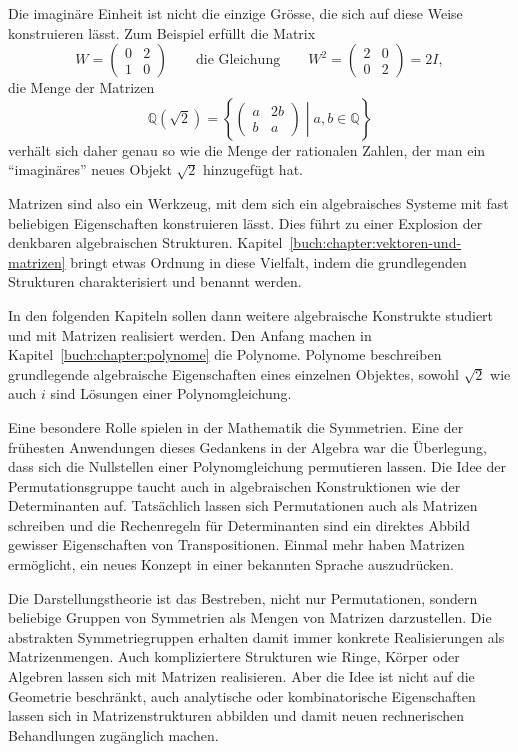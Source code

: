 Die imaginäre Einheit ist nicht die einzige Grösse, die sich auf diese
Weise konstruieren lässt.
Zum Beispiel erfüllt die Matrix
\[
W=\begin{pmatrix} 0&2\\1&0 \end{pmatrix}
\qquad\text{die Gleichung}\qquad
W^2 = \begin{pmatrix} 2&0\\0&2\end{pmatrix} = 2I,
\]
die Menge der Matrizen
\[
\mathbb{Q}(\!\sqrt{2})
=
\left\{\left.
\begin{pmatrix} a&2b\\ b&a\end{pmatrix}
\;\right|\;
a,b\in\mathbb{Q}
\right\}
\]
verhält sich daher genau so wie die Menge der rationalen Zahlen, der
man ein ``imaginäres'' neues Objekt $\!\sqrt{2}$ hinzugefügt hat.

Matrizen sind also ein Werkzeug, mit dem sich ein algebraisches Systeme
mit fast beliebigen Eigenschaften konstruieren lässt.
Dies führt zu einer Explosion der denkbaren algebraischen Strukturen.
Kapitel~\ref{buch:chapter:vektoren-und-matrizen} bringt etwas Ordnung
in diese Vielfalt, indem die grundlegenden Strukturen charakterisiert
und benannt werden.

In den folgenden Kapiteln sollen dann weitere algebraische Konstrukte
studiert und mit Matrizen realisiert werden.
Den Anfang machen in Kapitel~\ref{buch:chapter:polynome} die Polynome.
Polynome beschreiben grundlegende algebraische Eigenschaften eines
einzelnen Objektes, sowohl $\sqrt{2}$ wie auch $i$ sind Lösungen einer
Polynomgleichung.

Eine besondere Rolle spielen in der Mathematik die Symmetrien.
%
Eine der frühesten Anwendungen dieses Gedankens in der Algebra war
die Überlegung, dass sich die Nullstellen einer Polynomgleichung
permutieren lassen.
Die Idee der Permutationsgruppe taucht auch in algebraischen Konstruktionen
wie der Determinanten auf.
%
%
%
Tatsächlich lassen sich Permutationen auch als Matrizen schreiben
und die Rechenregeln für Determinanten sind ein direktes Abbild
gewisser Eigenschaften von Transpositionen.
%
Einmal mehr haben Matrizen ermöglicht, ein neues Konzept in einer
bekannten Sprache auszudrücken.

Die Darstellungstheorie ist das Bestreben, nicht nur Permutationen,
%
sondern beliebige Gruppen von Symmetrien als Mengen von Matrizen
darzustellen.
Die abstrakten Symmetriegruppen erhalten damit immer konkrete 
Realisierungen als Matrizenmengen.
Auch kompliziertere Strukturen wie Ringe, Körper oder Algebren
lassen sich mit Matrizen realisieren.
%
%
%
Aber die Idee ist nicht auf die Geometrie beschränkt, auch analytische
oder kombinatorische Eigenschaften lassen sich in Matrizenstrukturen
abbilden und damit neuen rechnerischen Behandlungen zugänglich
machen.

